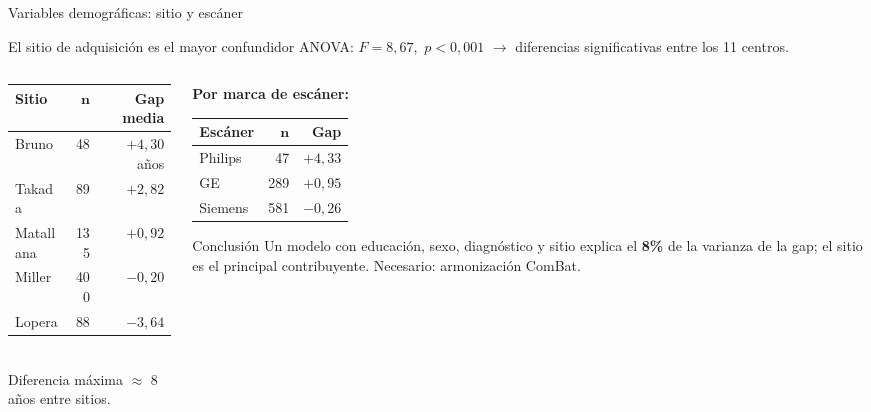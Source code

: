 \documentclass[aspectratio=169, 11pt]{beamer}
\begin{document}
\begin{frame}{Variables demográficas: sitio y escáner}
  \begin{block}{El sitio de adquisición es el mayor confundidor}
    ANOVA: $F = 8{,}67$,\ $p < 0{,}001$ \quad $\rightarrow$ diferencias significativas entre los 11 centros.
  \end{block}

  \vspace{0.2cm}
  \begin{columns}[T]
    \begin{column}{0.52\textwidth}
      {\small
      \begin{tabular}{lrr}
        \toprule
        \textbf{Sitio} & $\boldsymbol{n}$ & \textbf{Gap media} \\
        \midrule
        Bruno       & 48  & $+4{,}30$ años \\
        Takada      & 89  & $+2{,}82$ \\
        Matallana   & 135 & $+0{,}92$ \\
        Miller      & 400 & $-0{,}20$ \\
        Lopera      & 88  & $-3{,}64$ \\
        \bottomrule
      \end{tabular}}
      \\[4pt]
      {\scriptsize Diferencia máxima $\approx$ 8 años entre sitios.}
    \end{column}
    \begin{column}{0.44\textwidth}
      \textbf{Por marca de escáner:}
      \vspace{0.15cm}
      {\small
      \begin{tabular}{lrr}
        \toprule
        \textbf{Escáner} & $\boldsymbol{n}$ & \textbf{Gap} \\
        \midrule
        Philips  &  47 & $+4{,}33$ \\
        GE       & 289 & $+0{,}95$ \\
        Siemens  & 581 & $-0{,}26$ \\
        \bottomrule
      \end{tabular}}
      \vspace{0.25cm}
      \begin{alertblock}{\small Conclusión}
        {\footnotesize Un modelo con educación, sexo, diagnóstico y sitio explica el \textbf{8\%} de la varianza de la gap; el sitio es el principal contribuyente. Necesario: armonización ComBat.}
      \end{alertblock}
    \end{column}
  \end{columns}
\end{frame}
\end{document}
